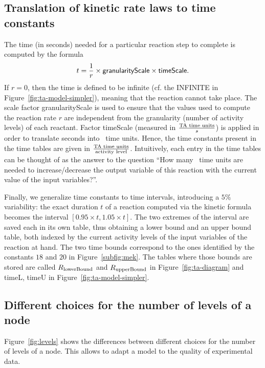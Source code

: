 \subsection{Translation of kinetic rate laws to time constants}\label{subsec:kinetics}

The time (in seconds) needed for a particular reaction step to complete is
computed by the formula
$$
t = \frac{1}{r} \times \mbox{\sf granularityScale} \times \mbox{\sf timeScale}.
$$
If $r = 0$, then the time is defined to be infinite (cf. the {\sf INFINITE} in Figure~\ref{fig:ta-model-simpler}),
meaning that the reaction cannot take place.
The scale factor {\sf granularityScale} is used to ensure that the values used to compute the
reaction rate $r$ are independent from the granularity (number of activity levels)
of each reactant.
Factor {\sf timeScale} (measured in $\frac{\mbox{\scriptsize TA time units}}{s}$)
is applied in order to translate seconds into \tas\ time units.
Hence, the time constants present in the time tables are given in $\frac{\mbox{\scriptsize TA time
units}}{\mbox{\scriptsize activity level}}$. Intuitively, each entry in the time tables can be thought of as
the answer to the question ``How many \tas\ time units are needed to increase/decrease the output variable
of this reaction with the current value of the input variables?''.

Finally,
we generalize time constants to time intervals, introducing a $5\%$ variability:
the exact duration $t$ of a reaction computed via the kinetic formula becomes the interval $[0.95\times t, 1.05\times t]$.
The two extremes of the interval are saved each in its own table, thus obtaining a lower bound and an upper bound table,
both indexed by the current activity levels of the input variables of the reaction at hand.
The two time bounds correspond to the ones identified by the constants $18$ and $20$ in Figure~\ref{subfig:mek}.
The tables where those bounds are stored are called $R_{\mbox{\scriptsize lowerBound}}$ and $R_{\mbox{\scriptsize upperBound}}$
in Figure~\ref{fig:ta-diagram} and {\sf timeL}, {\sf timeU} in Figure~\ref{fig:ta-model-simpler}.



\subsection{Different choices for the number of levels of a node}
Figure~\ref{fig:levels} shows the differences between different choices for the
number of levels of a node. This allows to adapt a model to the quality of experimental data.

